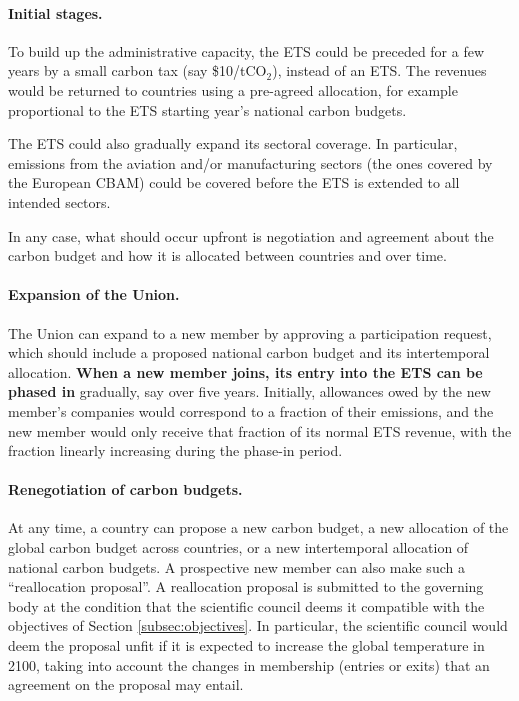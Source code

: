 \documentclass[12pt,english]{article}
\begin{document}
\paragraph{Initial stages.}

To build up the administrative capacity, the ETS could be preceded for a few years by a small carbon tax (say \$10/tCO$_\text{2}$), instead of an ETS. The revenues would be returned to countries using a pre-agreed allocation, for example proportional to the ETS starting year's national carbon budgets.

The ETS could also gradually expand its sectoral coverage. In particular, emissions from the aviation and/or manufacturing sectors (the ones covered by the European CBAM) could be covered before the ETS is extended to all intended sectors.

In any case, what should occur upfront is negotiation and agreement about the
carbon budget and how it is allocated between countries and over time.

\paragraph{Expansion of the Union.}
The Union can expand to a new member by approving a participation request, which should include a proposed national carbon budget and its intertemporal allocation. \textbf{When a new member joins, its entry into the ETS can be phased in} gradually, say over five years. Initially, allowances owed by the new member's companies would correspond to a fraction of their emissions, and the new member would only receive that fraction of its normal ETS revenue, with the fraction linearly increasing during the phase-in period. 

\paragraph{Renegotiation of carbon budgets.}
At any time, a country can propose a new carbon budget, a new allocation of the global carbon budget across countries, or a new intertemporal allocation of national carbon budgets. A prospective new member can also make such a ``reallocation proposal''. A reallocation proposal is submitted to the governing body at the condition that the scientific council deems it compatible with the objectives of Section \ref{subsec:objectives}. In particular, the scientific council would deem the proposal unfit if it is expected to increase the global temperature in 2100, taking into account the changes in membership (entries or exits) that an agreement on the proposal may entail.
\end{document}

